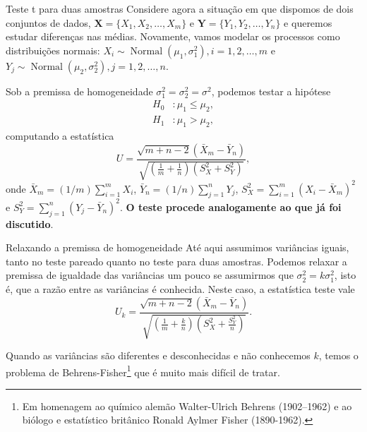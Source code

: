 \begin{frame}{Teste t para duas amostras}
Considere agora a situação em que dispomos de dois conjuntos de dados, $\boldsymbol{X} = \{X_1, X_2, \ldots, X_m\}$ e $\boldsymbol{Y} = \{Y_1, Y_2, \ldots, Y_n\}$ e queremos estudar diferenças nas médias.
Novamente, vamos modelar os processos como distribuições normais: $X_i \sim\operatorname{Normal}(\mu_1, \sigma_1^2), i = 1, 2, \ldots, m$ e $Y_j \sim\operatorname{Normal}(\mu_2, \sigma_2^2), j = 1, 2, \ldots, n$.

Sob a premissa de homogeneidade $\sigma_1^2 = \sigma_2^2 = \sigma^2$, podemos testar a hipótese
\begin{align*}
   H_0 &: \mu_1 \leq \mu_2, \\
   H_1 &: \mu_1 > \mu_2,
\end{align*}
computando a estatística 
\begin{equation*}
 U = \frac{\sqrt{m + n - 2}(\bar{X}_m - \bar{Y}_n)}{\sqrt{\left(\frac{1}{m} + \frac{1}{n}\right) (S_X^2 + S_Y^2)}},
\end{equation*}
onde $\bar{X}_m = (1/m)\sum_{i=1}^m X_i$,  $\bar{Y}_n = (1/n)\sum_{j=1}^n Y_j$, $S_X^2 = \sum_{i=1}^m (X_i-\bar{X}_m)^2$ e $S_Y^2 = \sum_{j=1}^n (Y_j-\bar{Y}_n)^2$.
\textbf{O teste procede analogamente ao que já foi discutido}.
\end{frame}

\begin{frame}{Relaxando a premissa de homogeneidade}
Até aqui assumimos variâncias iguais, tanto no teste pareado quanto no teste para duas amostras. 
Podemos relaxar a premissa de igualdade das variâncias um pouco se assumirmos que $\sigma_2^2 = k\sigma_1^2$, isto é, que a razão entre as variâncias é conhecida.
Neste caso, a estatística teste vale
\begin{equation*}
 U_k = \frac{\sqrt{m + n - 2}(\bar{X}_m - \bar{Y}_n)}{\sqrt{\left(\frac{1}{m} + \frac{k}{n}\right) (S_X^2 + \frac{S_Y^2}{n})}}.
\end{equation*}

Quando as variâncias são diferentes e desconhecidas e não conhecemos $k$, temos o problema de Behrens-Fisher\footnote{Em homenagem ao químico alemão Walter-Ulrich Behrens (1902--1962) e ao biólogo e estatístico britânico Ronald Aylmer Fisher (1890-1962).} que é muito mais difícil de tratar.
\end{frame}

